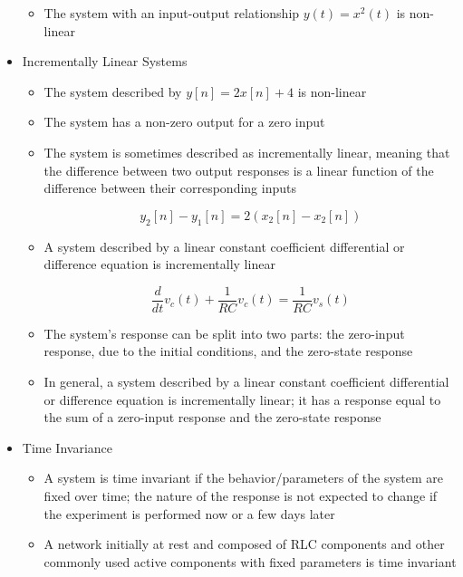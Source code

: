\begin{itemize}
\begin{itemize}
      \item The system with an input-output relationship $y(t)=x^2(t)$ is non-linear

    \end{itemize}

  \item Incrementally Linear Systems

    \begin{itemize}

      \item The system described by $y[n]=2x[n]+4$ is non-linear

      \item The system has a non-zero output for a zero input

      \item The system is sometimes described as incrementally linear, meaning that the difference between two output responses is a linear function of the difference between their corresponding inputs

        $$y_2[n]-y_1[n]=2(x_2[n]-x_2[n])$$

      \item A system described by a linear constant coefficient differential or difference equation is incrementally linear

        $$\frac{d}{dt}v_c(t)+\frac{1}{RC}v_c(t)=\frac{1}{RC}v_s(t)$$

      \item The system's response can be split into two parts: the zero-input response, due to the initial conditions, and the zero-state response

      \item In general, a system described by a linear constant coefficient differential or difference equation is incrementally linear; it has a response equal to the sum of a zero-input response and the zero-state response

    \end{itemize}

  \item Time Invariance

    \begin{itemize}

      \item A system is time invariant if the behavior/parameters of the system are fixed over time; the nature of the response is not expected to change if the experiment is performed now or a few days later

      \item A network initially at rest and composed of RLC components and other commonly used active components with fixed parameters is time invariant


\end{itemize}
\end{itemize}
